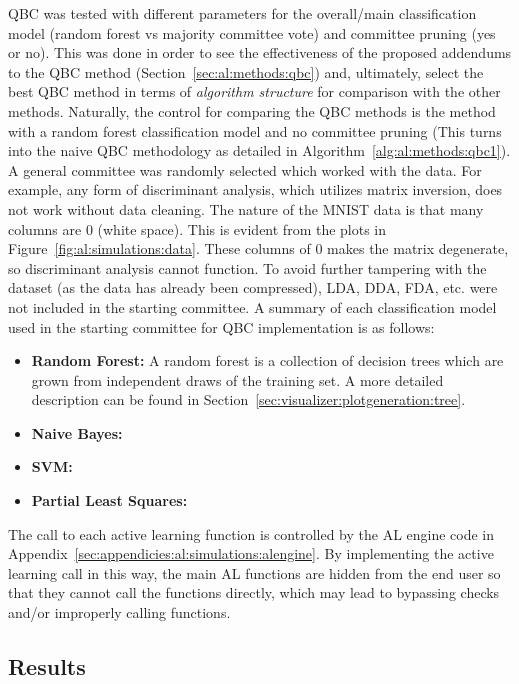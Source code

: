 \noindent QBC was tested with different parameters for the overall/main 
classification model (random forest vs majority committee vote) and committee 
pruning (yes or no). This was done in order to see the effectiveness of the 
proposed addendums to the QBC method (Section~\ref{sec:al:methods:qbc}) and, 
ultimately, select the best QBC method in terms of \textit{algorithm structure} 
for comparison with the other methods. Naturally, the control for comparing the 
QBC methods is the method with a random forest classification model and no 
committee pruning (This turns into the naive QBC methodology as detailed in 
Algorithm~\ref{alg:al:methods:qbc1}). A general committee was randomly selected 
which worked with the data. For example, any form of discriminant analysis, 
which utilizes matrix inversion, does not work without data cleaning. The 
nature of the MNIST data is that many columns are 0 (white space). This is 
evident from the plots in Figure~\ref{fig:al:simulations:data}. These columns 
of 0 makes the matrix degenerate, so discriminant analysis cannot function. 
To avoid further tampering with the dataset (as the data has already been 
compressed), LDA, DDA, FDA, etc. were not included in the starting committee. 
A summary of each classification model used in the starting committee for QBC 
implementation is as follows:

\tablespacing
\begin{itemize}
	\item \textbf{Random Forest:} A random forest is a collection of decision 
	trees which are grown from independent draws of the training set. A more 
	detailed description can be found in 
	Section~\ref{sec:visualizer:plotgeneration:tree}.
	\item \textbf{Naive Bayes:}
	\item \textbf{SVM:}
	\item \textbf{Partial Least Squares:}
\end{itemize}
\bodyspacing

The call to each active learning function is controlled by the AL engine code 
in Appendix~\ref{sec:appendicies:al:simulations:alengine}. By implementing the 
active learning call in this way, the main AL functions are hidden from the end 
user so that they cannot call the functions directly, which may lead to 
bypassing checks and/or improperly calling functions.



\subsection{Results}
\label{sec:al:simulation:results}

